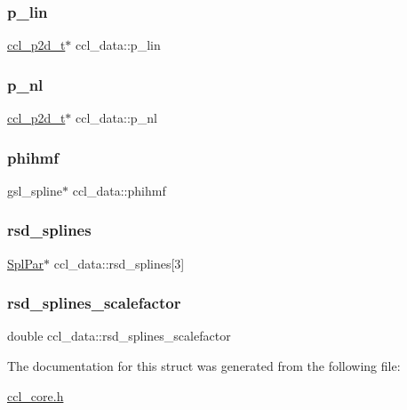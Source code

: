 \subsubsection{\texorpdfstring{p\+\_\+lin}{p\_lin}}
{\footnotesize\ttfamily \mbox{\hyperlink{structccl__p2d__t}{ccl\+\_\+p2d\+\_\+t}}$\ast$ ccl\+\_\+data\+::p\+\_\+lin}

\mbox{\label{structccl__data_ad5cbffe11bc08c851293f7b72b6a2f90}} 
\subsubsection{\texorpdfstring{p\+\_\+nl}{p\_nl}}
{\footnotesize\ttfamily \mbox{\hyperlink{structccl__p2d__t}{ccl\+\_\+p2d\+\_\+t}}$\ast$ ccl\+\_\+data\+::p\+\_\+nl}

\mbox{\label{structccl__data_a6417dfa54222033c8c229d3ca5e0866e}} 
\subsubsection{\texorpdfstring{phihmf}{phihmf}}
{\footnotesize\ttfamily gsl\+\_\+spline$\ast$ ccl\+\_\+data\+::phihmf}

\mbox{\label{structccl__data_ac655eaa75acfd755a45bb39e2344d800}} 
\subsubsection{\texorpdfstring{rsd\+\_\+splines}{rsd\_splines}}
{\footnotesize\ttfamily \mbox{\hyperlink{struct_spl_par}{Spl\+Par}}$\ast$ ccl\+\_\+data\+::rsd\+\_\+splines\mbox{[}3\mbox{]}}

\mbox{\label{structccl__data_ad599220fa8b248458b36d48906b75d1d}} 
\subsubsection{\texorpdfstring{rsd\+\_\+splines\+\_\+scalefactor}{rsd\_splines\_scalefactor}}
{\footnotesize\ttfamily double ccl\+\_\+data\+::rsd\+\_\+splines\+\_\+scalefactor}



The documentation for this struct was generated from the following file\+:\begin{DoxyCompactItemize}
\item 
\mbox{\hyperlink{ccl__core_8h}{ccl\+\_\+core.\+h}}\end{DoxyCompactItemize}
